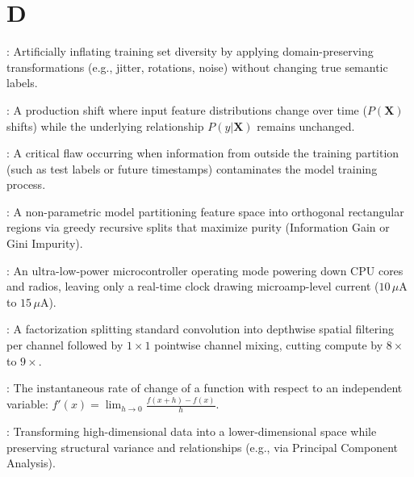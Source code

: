 \section*{D}
\begin{description}[leftmargin=!,labelwidth=4.5cm,itemsep=1.5ex]
\item[\textbf{Data Augmentation}\hfill \textnormal{\sffamily\scriptsize\color{keyideablue}[Deep Learning]}]: Artificially inflating training set diversity by applying domain-preserving transformations (e.g., jitter, rotations, noise) without changing true semantic labels.
\item[\textbf{Data Drift}\hfill \textnormal{\sffamily\scriptsize\color{keyideablue}[MLOps]}]: A production shift where input feature distributions change over time ($P(\mathbf{X})$ shifts) while the underlying relationship $P(y|\mathbf{X})$ remains unchanged.
\item[\textbf{Data Leakage}\hfill \textnormal{\sffamily\scriptsize\color{keyideablue}[Data Engineering]}]: A critical flaw occurring when information from outside the training partition (such as test labels or future timestamps) contaminates the model training process.
\item[\textbf{Decision Tree}\hfill \textnormal{\sffamily\scriptsize\color{keyideablue}[Classical ML]}]: A non-parametric model partitioning feature space into orthogonal rectangular regions via greedy recursive splits that maximize purity (Information Gain or Gini Impurity).
\item[\textbf{Deep Sleep}\hfill \textnormal{\sffamily\scriptsize\color{keyideablue}[IoT \& Hardware]}]: An ultra-low-power microcontroller operating mode powering down CPU cores and radios, leaving only a real-time clock drawing microamp-level current ($10\,\mu\text{A}$ to $15\,\mu\text{A}$).
\item[\textbf{Depthwise Separable Convolution}\hfill \textnormal{\sffamily\scriptsize\color{keyideablue}[Deep Learning]}]: A factorization splitting standard convolution into depthwise spatial filtering per channel followed by $1 \times 1$ pointwise channel mixing, cutting compute by $8\times$ to $9\times$.
\item[\textbf{Derivative}\hfill \textnormal{\sffamily\scriptsize\color{keyideablue}[Mathematics]}]: The instantaneous rate of change of a function with respect to an independent variable: $f'(x) = \lim_{h \to 0} \frac{f(x+h) - f(x)}{h}$.
\item[\textbf{Dimensionality Reduction}\hfill \textnormal{\sffamily\scriptsize\color{keyideablue}[Classical ML]}]: Transforming high-dimensional data into a lower-dimensional space while preserving structural variance and relationships (e.g., via Principal Component Analysis).

\end{description}

